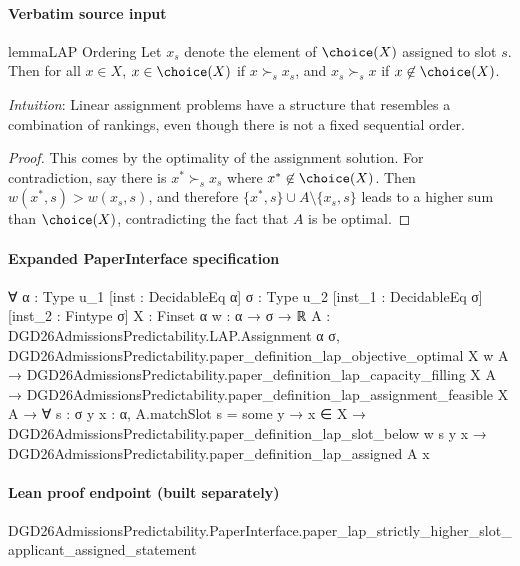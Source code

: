 \documentclass[10pt]{article}
\begin{document}
\paragraph{Verbatim source input}
\begin{ReviewVerbatim}
\begin{restatable}{lemma}{LAP Ordering}
\label{lem:lap-ordering}
Let $x_{s}$ denote the element of $\choice(X)$ assigned to slot $s$. Then for all $x \in X$, $x \in \choice(X)$ if $x \succ_s x_s$, and $x_s \succ_s x$ if $x \not\in \choice(X)$.
\end{restatable}

\textit{Intuition}: Linear assignment problems have a structure that resembles a combination of rankings, even though there is not a fixed sequential order.

\begin{proof}
This comes by the optimality of the assignment solution. For contradiction, say there is $x^* \succ_s x_s$ where $x^* \not\in \choice(X)$. Then $w(x^*, s) > w(x_s, s)$, and therefore $\{x^*, s\} \cup A \setminus \{x_s, s\}$ leads to a higher sum than $\choice(X)$, contradicting the fact that $A$ is be optimal.
\end{proof}
\end{ReviewVerbatim}


\paragraph{Expanded PaperInterface specification}
\begin{ReviewVerbatim}
∀ {α : Type u_1} [inst : DecidableEq α] {σ : Type u_2} [inst_1 : DecidableEq σ] [inst_2 : Fintype σ] {X : Finset α}
  {w : α → σ → ℝ} {A : DGD26AdmissionsPredictability.LAP.Assignment α σ},
  DGD26AdmissionsPredictability.paper_definition_lap_objective_optimal X w A →
    DGD26AdmissionsPredictability.paper_definition_lap_capacity_filling X A →
      DGD26AdmissionsPredictability.paper_definition_lap_assignment_feasible X A →
        ∀ {s : σ} {y x : α},
          A.matchSlot s = some y →
            x ∈ X →
              DGD26AdmissionsPredictability.paper_definition_lap_slot_below w s y x →
                DGD26AdmissionsPredictability.paper_definition_lap_assigned A x
\end{ReviewVerbatim}

\paragraph{Lean proof endpoint (built separately)}\begin{ReviewVerbatim}
DGD26AdmissionsPredictability.PaperInterface.paper_lap_strictly_higher_slot_applicant_assigned_statement
\end{ReviewVerbatim}
\end{document}
